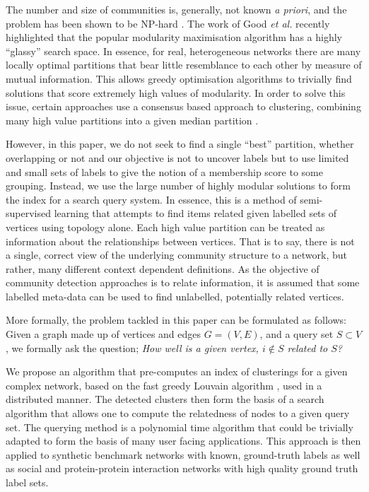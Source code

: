 \documentclass[sigconf]{acmart}
\begin{document}
The number and size of communities is, generally, not known \textit{a priori}, and the problem has been shown to be NP-hard \cite{npHardModularity}.
The work of Good \textit{et al.} \cite{good2010performance} recently highlighted that the popular modularity maximisation algorithm has a highly ``glassy'' search space.
In essence, for real, heterogeneous networks there are many locally optimal partitions that bear little resemblance to each other by measure of mutual information.
This allows greedy optimisation algorithms \cite{blondel2008fast} to trivially find solutions that score extremely high values of modularity.
In order to solve this issue, certain approaches use a consensus based approach to clustering, combining many high value partitions into a given median partition \cite{lancichinetti2012consensus}.

However, in this paper, we do not seek to find a single ``best'' partition, whether overlapping or not and our objective is not to uncover labels but to use limited and small sets of labels to give the notion of a membership score to some grouping.
Instead, we use the large number of highly modular solutions to form the index for a search query system.
In essence, this is a method of semi-supervised learning that attempts to find items related given labelled sets of vertices using topology alone.
Each high value partition can be treated as information about the relationships between vertices.
That is to say, there is not a single, correct view of the underlying community structure to a network, but rather, many different context dependent definitions.
As the objective of community detection approaches is to relate information, it is assumed that some labelled meta-data can be used to find unlabelled, potentially related vertices.

More formally, the problem tackled in this paper can be formulated as follows:
Given a graph made up of vertices and edges $G = (V, E)$, and a query set $S \subset V$, we formally ask the question; \textit{How well is a given vertex, $i \notin S$ related to $S$?}

We propose an algorithm that pre-computes an index of clusterings for a given complex network, based on the fast greedy Louvain algorithm \cite{blondel2008fast}, used in a distributed manner.
The detected clusters then form the basis of a search algorithm that allows one to compute the relatedness of nodes to a given query set.
The querying method is a polynomial time algorithm that could be trivially adapted to form the basis of many user facing applications.
This approach is then applied to synthetic benchmark networks with known, ground-truth labels as well as social and protein-protein interaction networks with high quality ground truth label sets.
\end{document}
